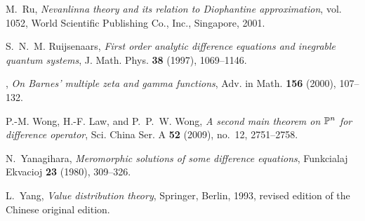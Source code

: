 \documentclass{amsart}
\theoremstyle{definition}
\numberwithin{equation}{section}
\numberwithin{theorem}{section}
\begin{document}
\begin{thebibliography}{10}
M.~Ru, \emph{Nevanlinna theory and its relation to {D}iophantine
  approximation}, vol. 1052, World Scientific Publishing Co., Inc., Singapore,
  2001.

S.~N.~M. Ruijsenaars, \emph{First order analytic difference equations and
  inegrable quantum systems}, J. Math. Phys. \textbf{38} (1997), 1069--1146.

\bysame, \emph{On {B}arnes' multiple zeta and gamma functions}, Adv. in Math.
  \textbf{156} (2000), 107--132.

P.-M. Wong, H.-F. Law, and P.~P.~W. Wong, \emph{A second main theorem on {$\Bbb
  P^n$} for difference operator}, Sci. China Ser. A \textbf{52} (2009), no.~12,
  2751--2758.

N.~Yanagihara, \emph{Meromorphic solutions of some difference equations},
  Funkcialaj Ekvacioj \textbf{23} (1980), 309--326.

L.~Yang, \emph{Value distribution theory}, Springer, Berlin, 1993, revised
  edition of the {C}hinese original edition.

\end{thebibliography}
\end{document}
